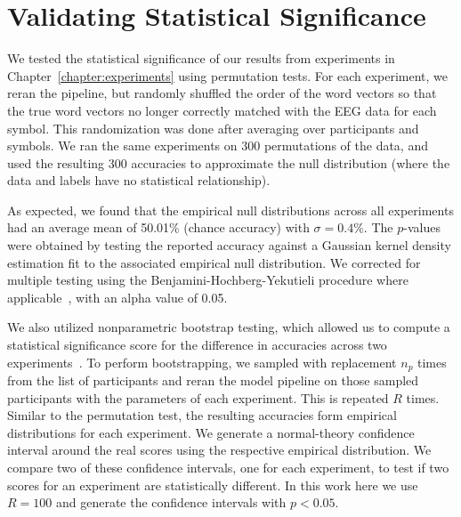 \section{Validating Statistical Significance}

We tested the statistical significance of our results from experiments in 
Chapter~\ref{chapter:experiments} using permutation tests. For each experiment, 
we reran the pipeline, but randomly shuffled the order of the word vectors so 
that the true word vectors no longer correctly matched with the EEG data for 
each symbol. This randomization was done after averaging over participants and 
symbols. We ran the same experiments on 300 permutations of the data, and used 
the resulting 300 \tvt accuracies to approximate the null distribution (where 
the data and labels have no statistical relationship). 

As expected, we found that the empirical null distributions across all 
experiments had an average mean of 50.01\% (chance accuracy) with $\sigma = 
0.4\%$. The $p$-values were obtained by testing the reported accuracy against a 
Gaussian kernel density estimation fit to the associated empirical null 
distribution. We corrected for multiple testing using the 
Benjamini-Hochberg-Yekutieli procedure where 
applicable~\cite{benjamini2001control}, with an alpha value of 0.05.

We also utilized nonparametric bootstrap testing, which allowed us to compute a 
statistical significance score for the difference in \tvt accuracies across two 
experiments~\cite{davison1997bootstrap}. To perform bootstrapping, we sampled 
with replacement $n_p$ times from the list of participants and reran the model 
pipeline on those sampled participants with the parameters of each experiment.  
This is repeated $R$ times.  Similar to the permutation test, the resulting 
\tvt accuracies form empirical distributions for each experiment. We generate a 
normal-theory confidence interval around the real \tvt scores using the 
respective empirical distribution. We compare two of these confidence 
intervals, one for each experiment, to test if two \tvt scores for an 
experiment are statistically different. In this work here we use $R = 100$ and 
generate the confidence intervals with $p < 0.05$.
